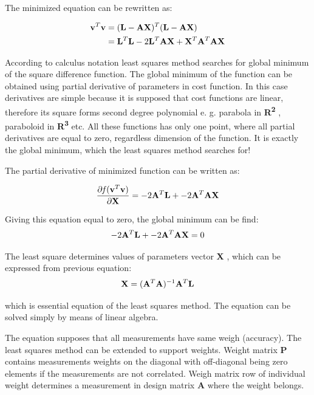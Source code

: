 \documentclass[a4paper,12pt]{article}
\newcommand{\ematr}[1]{
{\bf #1}
}
\newcommand{\evect}[1]{
{\bf #1}
}
\newcommand{\eucl}[1]{
{\bf R\textsuperscript{#1}}
}
\newcommand{\efunc}[1]{
{\it #1}
}
\begin{document}
The minimized equation can be rewritten as:

\begin{equation}
\begin{split}
\evect{v}^{T} \evect{v} &= (\evect{L} - \ematr{A}\ematr{X})^{T} (\evect{L} - \ematr{A}\ematr{X}) \\
&= \evect{L}^{T} \evect{L} - 2 \evect{L}^{T} \ematr{A} \evect{X} + \evect{X}^{T} \ematr{A}^{T} \ematr{A} \evect{X}
\label{eq:least_be_part}
\end{split}
\end{equation} 

According to calculus notation least squares method searches for global minimum of the square difference function. 
The global minimum of the function can be obtained using partial derivative of parameters in cost function.
In this case derivatives are simple because it is supposed that cost functions are linear, therefore 
its square forms  second degree polynomial e. g. parabola in \eucl{2}, paraboloid in \eucl{3} etc. All these functions has
only one point, where all partial derivatives are equal to zero, regardless dimension of the function. It is 
exactly the global minimum, which the least squares method searches for!

The partial derivative of minimized function can be written as:
 
\begin{equation}
\frac{\partial \efunc{f} (\evect{v}^{T} \evect{v}) }{\partial \evect{X}} = -2\ematr{A}^{T} \evect{L} + -2\ematr{A}^{T}\ematr{A} \evect{X} 
\label{eq:least_part}
\end{equation} 

Giving this equation equal to zero, the global minimum can be find:
\begin{equation}
-2\ematr{A}^{T} \evect{L} + -2\ematr{A}^{T}\ematr{A} \evect{X} = 0 
\end{equation} 

The least square determines values of parameters vector \evect{X}, which can be expressed from previous equation:
\begin{equation}
\evect{X} = (\ematr{A}^{T} \ematr{A})^{-1} \ematr{A}^{T} \ematr{L}
\end{equation}

which is essential equation of the least squares method. The equation can be solved simply by means of linear algebra.

The equation supposes that all measurements have same weigh (accuracy). The least squares method can be extended to support weights.
Weight matrix \ematr{P} contains measurements weights on the diagonal with off-diagonal being zero elements if
the measurements are not correlated.
Weigh matrix row of individual weight determines a measurement in design matrix \ematr{A} where the weight belongs.
\end{document}
